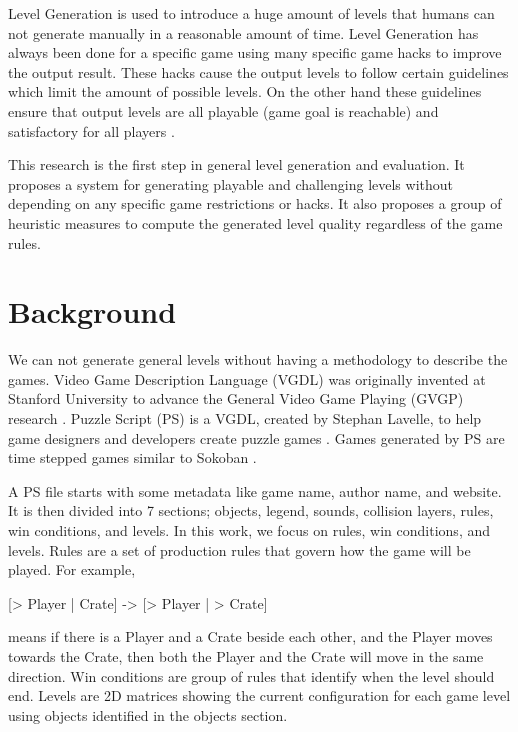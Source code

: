 \documentclass[letterpaper]{article}
\begin{document}
Level Generation is used to introduce a huge amount of levels that humans can not generate manually in a reasonable amount of time. Level Generation has always been done for a specific game using many specific game hacks to improve the output result. These hacks cause the output levels to follow certain guidelines which limit the amount of possible levels. On the other hand these guidelines ensure that output levels are all playable (game goal is reachable) and satisfactory for all players \citeauthor{mcGenerateEverything}.\\\par

This research is the first step in general level generation and evaluation. It proposes a system for generating playable and challenging levels without depending on any specific game restrictions or hacks. It also proposes a group of heuristic measures to compute the generated level quality regardless of the game rules.

\section{Background}
We can not generate general levels without having a methodology to describe the games. Video Game Description Language (VGDL) was originally invented at Stanford University to advance the General Video Game Playing (GVGP) research \citeauthor{gvgp}. Puzzle Script (PS) is a VGDL, created by Stephan Lavelle, to help game designers and developers create puzzle games \citeauthor{puzzleScript}. Games generated by PS are time stepped games similar to Sokoban \citeauthor{sokoban}.\\\par

A PS file starts with some metadata like game name, author name, and website. It is then divided into 7 sections; objects, legend, sounds, collision layers, rules, win conditions, and levels. In this work, we focus on rules, win conditions, and levels. Rules are a set of production rules that govern how the game will be played. For example, \begin{center}[> Player | Crate] -> [> Player | > Crate]\end{center} means if there is a Player and a Crate beside each other, and the Player moves towards the Crate, then both the Player and the Crate will move in the same direction. Win conditions are group of rules that identify when the level should end. Levels are 2D matrices showing the current configuration for each game level using objects identified in the objects section.
\end{document}
